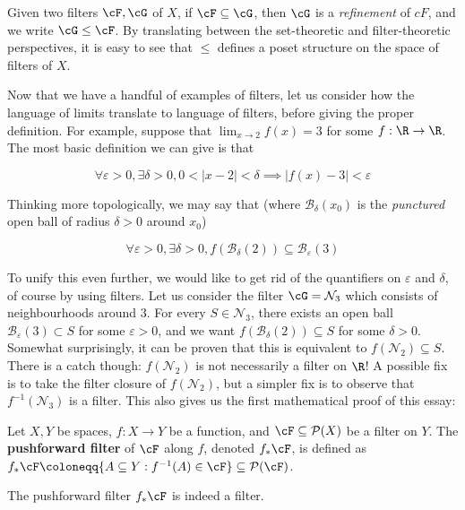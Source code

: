 Given two filters \(\cF, \cG\) of \(X\), if \(\cF \subseteq \cG\), then \(\cG\) is a \textit{refinement} of \(cF\), and we write \(\cG \leq \cF\). By translating between the set-theoretic and filter-theoretic perspectives, it is easy to see that \(\leq\) defines a poset structure on the space of filters of \(X\).

Now that we have a handful of examples of filters, let us consider how the language of limits translate to language of filters, before giving the proper definition. For example, suppose that \(\lim_{x \to 2} f(x) = 3\) for some \(f : \R \to \R\). The most basic definition we can give is that

\[
  \forall \varepsilon > 0, \exists \delta > 0, 0 < |x - 2| < \delta \implies |f(x) - 3| < \varepsilon
\]

Thinking more topologically, we may say that (where \(\mathcal{B}_{\delta}(x_0)\) is the \textit{punctured} open ball of radius \(\delta > 0\) around \(x_0\))

\[
  \forall \varepsilon > 0, \exists \delta > 0, f\left(\mathcal{B}_{\delta}(2)\right) \subseteq \mathcal{B}_{\varepsilon}(3)
\]

To unify this even further, we would like to get rid of the quantifiers on \(\varepsilon\) and \(\delta\), of course by using filters. Let us consider the filter \(\cG = \mathcal{N}_3\) which consists of neighbourhoods around \(3\). For every \(S \in \mathcal{N}_3\), there exists an open ball \(\mathcal{B}_{\varepsilon}(3) \subset S\) for some \(\varepsilon > 0\), and we want \(f\left(\mathcal{B}_{\delta}(2)\right) \subseteq S\) for some \(\delta > 0\). Somewhat surprisingly, it can be proven that this is equivalent to \(f(\mathcal{N}_2) \subseteq S\). There is a catch though: \(f(\mathcal{N}_2)\) is not necessarily a filter on \(\R\)! A possible fix is to take the filter closure of \(f(\mathcal{N}_2)\), but a simpler fix is to observe that \(f^{-1}(\mathcal{N}_3)\) is a filter. This also gives us the first mathematical proof of this essay:

\begin{definition}
  Let \(X, Y\) be spaces, \(f : X \to Y\) be a function, and \(\cF \subseteq \mathcal{P}(X)\) be a filter on \(Y\). The \textbf{pushforward filter} of \(\cF\) along \(f\), denoted \(f_*\cF\), is defined as \(f_*\cF \coloneqq \{A \subseteq Y : f^{-1}(A) \in \cF\} \subseteq \mathcal{P}(\cF)\).
\end{definition}

\begin{lemma}
  The pushforward filter \(f_*\cF\) is indeed a filter.
\end{lemma}

